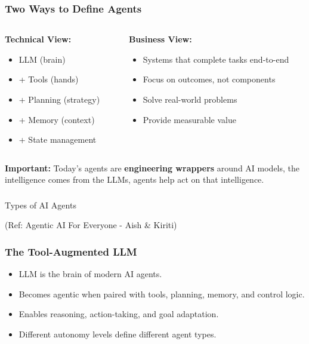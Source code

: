 \begin{frame}[fragile]\frametitle{Two Ways to Define Agents}
\begin{columns}
    \begin{column}[T]{0.5\linewidth}
        \textbf{Technical View:}
        \begin{itemize}
            \item LLM (brain)
            \item + Tools (hands)
            \item + Planning (strategy)
            \item + Memory (context)
            \item + State management
        \end{itemize}
    \end{column}
    \begin{column}[T]{0.5\linewidth}
        \textbf{Business View:}
        \begin{itemize}
            \item Systems that complete tasks end-to-end
            \item Focus on outcomes, not components
            \item Solve real-world problems
            \item Provide measurable value
        \end{itemize}
    \end{column}
\end{columns}

\vspace{0.5cm}
\textbf{Important:} Today's agents are \textbf{engineering wrappers} around AI models, the intelligence comes from the LLMs, agents help act on that intelligence.
\end{frame}

\begin{frame}[fragile]\frametitle{}
\begin{center}
{\Large Types of AI Agents}

{\tiny (Ref: Agentic AI For Everyone - Aish \& Kiriti)}
\end{center}
\end{frame}

\begin{frame}[fragile]\frametitle{The Tool-Augmented LLM}
    \begin{itemize}
        \item LLM is the brain of modern AI agents.
        \item Becomes agentic when paired with tools, planning, memory, and control logic.
        \item Enables reasoning, action-taking, and goal adaptation.
        \item Different autonomy levels define different agent types.
    \end{itemize}

\end{frame}


